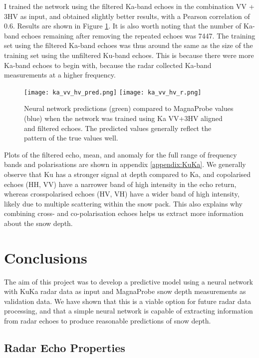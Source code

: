 \documentclass[11pt, a4paper]{article}
\begin{document}
I trained the network using the filtered Ka-band echoes in the combination VV + 3HV as input, and obtained slightly better results, with a Pearson correlation of 0.6.  Results are shown in Figure \ref{fig:kafiltpred}. It is also worth noting that the number of Ka-band echoes remaining after removing the repeated echoes was 7447. The training set using the filtered Ka-band echoes was thus around the same as the size of the training set using the unfiltered Ku-band echoes. This is because there were more Ka-band echoes to begin with, because the radar collected Ka-band measurements at a higher frequency.

\begin{figure}
\centering
   		 \texttt{[image: ka\_vv\_hv\_pred.png]}
   		 \texttt{[image: ka\_vv\_hv\_r.png]}
    		\caption{Neural network predictions (green) compared to MagnaProbe values (blue) when the network was trained using Ka VV+3HV aligned and filtered echoes. The predicted values generally reflect the pattern of the true values well.}
	\label{fig:kafiltpred}
\end{figure}

Plots of the filtered echo, mean, and anomaly for the full range of frequency bands and polarisations are shown in appendix \ref{appendix:KuKa}.  We generally observe that Ku has a stronger signal at depth compared to Ka, and copolarised echoes (HH, VV) have a narrower band of high intensity in the echo return, whereas crosspolarised echoes (HV, VH) have a wider band of high intensity, likely due to multiple scattering within the snow pack. This also explains why combining cross- and co-polarisation echoes helps us extract more information about the snow depth.

\pagebreak
\section{Conclusions}

The aim of this project was to develop a predictive model using a neural network with KuKa radar data as input and MagnaProbe snow depth measurements as validation data.  We have shown that this is a viable option for future radar data processing, and that a simple neural network is capable of extracting information from radar echoes to produce reasonable predictions of snow depth.

\subsection{Radar Echo Properties}
\end{document}
